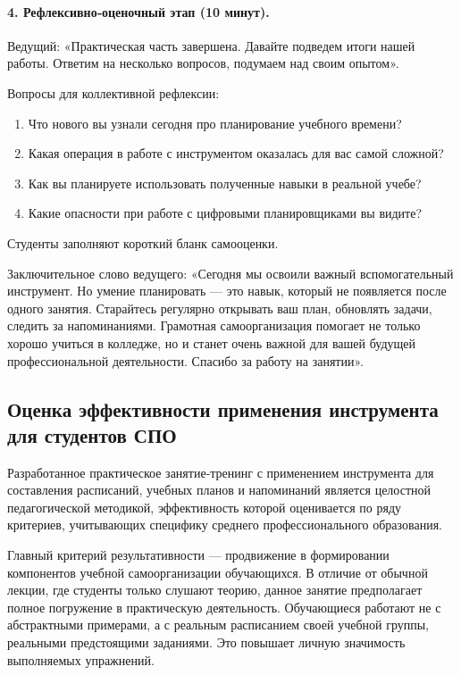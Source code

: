 \documentclass[14pt,a4paper]{article}
\begin{document}
\paragraph{4. Рефлексивно‑оценочный этап (10 минут).}
Ведущий: «Практическая часть завершена. Давайте подведем итоги нашей работы. Ответим на несколько вопросов, подумаем над своим опытом».

Вопросы для коллективной рефлексии:
\begin{enumerate}
    \item Что нового вы узнали сегодня про планирование учебного времени?
    \item Какая операция в работе с инструментом оказалась для вас самой сложной?
    \item Как вы планируете использовать полученные навыки в реальной учебе?
    \item Какие опасности при работе с цифровыми планировщиками вы видите?
\end{enumerate}

Студенты заполняют короткий бланк самооценки.

Заключительное слово ведущего: «Сегодня мы освоили важный вспомогательный инструмент. Но умение планировать — это навык, который не появляется после одного занятия. Старайтесь регулярно открывать ваш план, обновлять задачи, следить за напоминаниями. Грамотная самоорганизация помогает не только хорошо учиться в колледже, но и станет очень важной для вашей будущей профессиональной деятельности. Спасибо за работу на занятии».


\subsection{Оценка эффективности применения инструмента для студентов СПО}

Разработанное практическое занятие‑тренинг с применением инструмента для составления расписаний, учебных планов и напоминаний является целостной педагогической методикой, эффективность которой оценивается по ряду критериев, учитывающих специфику среднего профессионального образования.

Главный критерий результативности — продвижение в формировании компонентов учебной самоорганизации обучающихся. В отличие от обычной лекции, где студенты только слушают теорию, данное занятие предполагает полное погружение в практическую деятельность. Обучающиеся работают не с абстрактными примерами, а с реальным расписанием своей учебной группы, реальными предстоящими заданиями. Это повышает личную значимость выполняемых упражнений.
\end{document}
